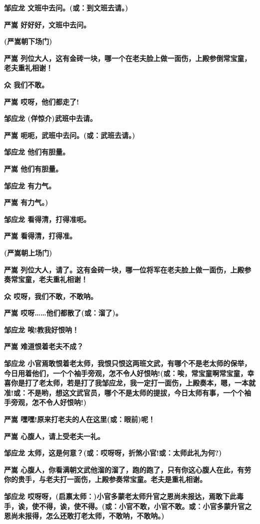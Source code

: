 \textbf{邹应龙 文班中去问。(或：到文班去请。)}

\textbf{严嵩 好好好，文班中去问。}

\textbf{(严嵩朝下场门)}

\textbf{严嵩
列位大人，这有金砖一块，哪一个在老夫脸上做一面伤，上殿参倒常宝童，老夫重礼相谢！}

\textbf{众 我们不敢。}

\textbf{严嵩 哎呀，他们都走了!}

\textbf{邹应龙 (佯惊介)武班中去请。}

\textbf{严嵩 呃呃，武班中去问。(或：武班去请。)}

\textbf{邹应龙 他们有胆量。}

\textbf{严嵩 他们有胆量。}

\textbf{邹应龙 有力气。}

\textbf{严嵩 有力气。)}

\textbf{邹应龙 看得清，打得准呃。}

\textbf{严嵩 看得清，打得准。}

\textbf{(严嵩朝上场门)}

\textbf{严嵩
列位大人，请了。这有金砖一块，哪一位将军在老夫脸上做一面伤，上殿参奏常宝童，老夫重礼相谢！}

\textbf{众 哎呀，我们不敢，不敢呐。}

\textbf{严嵩 哎呀\ldots{}\ldots{}他们都散了(或：溜了)。}

\textbf{邹应龙 唉!教我好恨呐！}

\textbf{严嵩 难道恨着老夫不成？}

\textbf{邹应龙
小官焉敢恨着老太师，我恨只恨这两班文武，有哪个不是老太师的保举，今日用着他们，一个个袖手旁观，怎不令人好恨呐!(或：唉，常宝童啊常宝童，幸喜你是打了老太师，若是打了我邹应龙，我一定打一面伤，上殿奏本，嗯，一本就准!或：不是哟，想这文武官员，哪个不是太师的提拔，今日太师有事，一个个袖手旁观，怎不令人好恨呐!)}

\textbf{严嵩 嘿嘿!原来打老夫的人在这里(或：眼前)呢！}

\textbf{严嵩 心腹人，请上受老夫一礼。}

\textbf{邹应龙 太师，这是何意？(或：哎呀呀，折煞小官!或：太师此礼为何?)}

\textbf{严嵩
心腹人，你看满朝文武他溜的溜了，跑的跑了，只有你这心腹人在此，有劳你的贵手，与老夫打一面伤，上殿参奏常宝童。老夫是重礼相谢。}

\textbf{邹应龙
哎呀呀，(启禀太师：)小官多蒙老太师升官之恩尚未报达，焉敢下此毒手，诶，使不得，诶，使不得。(或：小官不敢，小官不敢。或：小官多蒙升官之恩尚未报得，怎么还敢打老太师，不敢呐，不敢呐。)}

